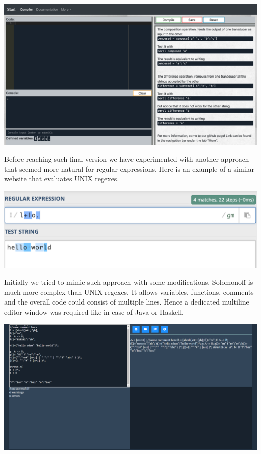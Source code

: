 \begin{center}
	\includegraphics[scale=0.3]{web8.png}
\end{center}
Before reaching such final version we have experimented with another approach that seemed more natural for regular expressions. Here is an example of a similar website that evaluates UNIX regexes.
\begin{center}
	\includegraphics[scale=0.65]{regex.png}
\end{center}
Initially we tried to mimic such approach with some modifications. Solomonoff is much more complex than UNIX regexes. It allows variables, functions, comments and the overall code could consist of multiple lines. Hence a dedicated multiline editor window was required like in case of Java or Haskell.
\begin{center}
	\includegraphics[scale=0.2]{web3.png}
\end{center}
